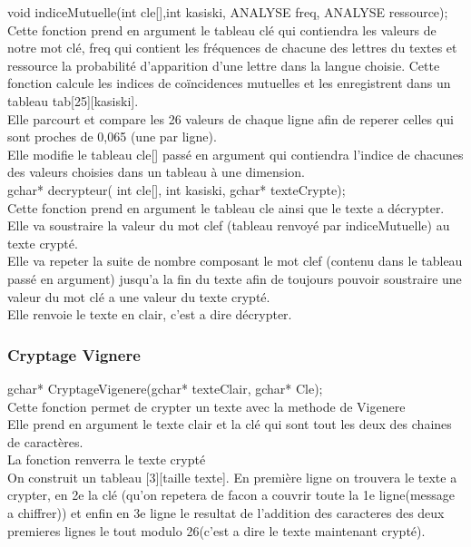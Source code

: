 \documentclass[a4]{article}
\begin{document}
	void indiceMutuelle(int cle[],int kasiski, ANALYSE freq, ANALYSE ressource);\\
		Cette fonction prend en argument le tableau clé qui contiendra les valeurs de notre mot clé, freq qui contient les fréquences de chacune des lettres du textes et ressource la
		probabilité d'apparition d'une lettre dans la langue choisie.
		Cette fonction calcule les indices de coïncidences mutuelles et les enregistrent dans un tableau tab[25][kasiski].\\
		Elle parcourt et compare les 26 valeurs de chaque ligne afin de reperer celles qui sont proches de 0,065 (une par ligne).\\
		Elle modifie le tableau cle[] passé en argument qui contiendra l'indice de chacunes des valeurs choisies dans un tableau à une dimension. \\
	
	gchar* decrypteur( int cle[], int kasiski, gchar* texteCrypte);\\
		Cette fonction prend en argument le tableau cle ainsi que le texte a décrypter.
		Elle va soustraire la valeur du mot clef (tableau renvoyé par indiceMutuelle) au texte crypté.\\
		Elle va repeter la suite de nombre composant le mot clef (contenu dans le tableau passé en argument) jusqu'a la fin du texte afin de toujours pouvoir
		soustraire une valeur du mot clé a une valeur du texte crypté.\\
		Elle renvoie le texte en clair, c'est a dire décrypter.\\
		
		\subsubsection{Cryptage Vignere}
	gchar* CryptageVigenere(gchar* texteClair, gchar* Cle);\\
		Cette fonction permet de crypter un texte avec la methode de Vigenere\\
		Elle prend en argument le texte clair et la clé qui sont tout les deux des chaines de caractères.\\
		La fonction renverra le texte crypté\\
		On construit un tableau [3][taille texte]. En première ligne on trouvera le texte a crypter, 
		en 2e la clé (qu'on repetera de facon a couvrir toute la 1e ligne(message a chiffrer)) et enfin 
		en 3e ligne le resultat de l'addition des caracteres des deux premieres lignes le tout modulo 
		26(c'est a dire le texte maintenant crypté).
		
\end{document}
